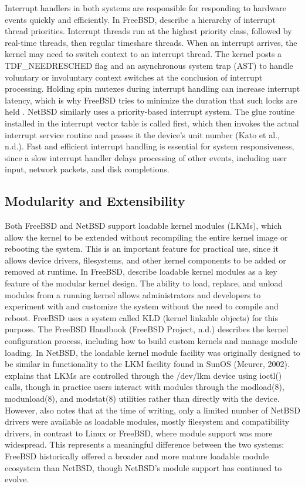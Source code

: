 Interrupt handlers in both systems are responsible for responding to hardware events quickly and efficiently. In FreeBSD, \textcite{watson2015} describe a hierarchy of interrupt thread priorities. Interrupt threads run at the highest priority class, followed by real-time threads, then regular timeshare threads. When an interrupt arrives, the kernel may need to switch context to an interrupt thread. The kernel posts a TDF\_NEEDRESCHED flag and an asynchronous system trap (AST) to handle voluntary or involuntary context switches at the conclusion of interrupt processing. Holding spin mutexes during interrupt handling can increase interrupt latency, which is why FreeBSD tries to minimize the duration that such locks are held \parencite{watson2015}.
NetBSD similarly uses a priority-based interrupt system. The glue routine installed in the interrupt vector table is called first, which then invokes the actual interrupt service routine and passes it the device's unit number (Kato et al., n.d.). Fast and efficient interrupt handling is essential for system responsiveness, since a slow interrupt handler delays processing of other events, including user input, network packets, and disk completions.


\subsection{Modularity and Extensibility}
Both FreeBSD and NetBSD support loadable kernel modules (LKMs), which allow the kernel to be extended without recompiling the entire kernel image or rebooting the system. This is an important feature for practical use, since it allows device drivers, filesystems, and other kernel components to be added or removed at runtime.
In FreeBSD, \textcite{watson2015} describe loadable kernel modules as a key feature of the modular kernel design. The ability to load, replace, and unload modules from a running kernel allows administrators and developers to experiment with and customize the system without the need to compile and reboot. FreeBSD uses a system called KLD (kernel linkable objects) for this purpose. The FreeBSD Handbook (FreeBSD Project, n.d.) describes the kernel configuration process, including how to build custom kernels and manage module loading.
In NetBSD, the loadable kernel module facility was originally designed to be similar in functionality to the LKM facility found in SunOS (Meurer, 2002). \textcite{meurer2002} explains that LKMs are controlled through the /dev/lkm device using ioctl() calls, though in practice users interact with modules through the modload(8), modunload(8), and modstat(8) utilities rather than directly with the device. However, \textcite{meurer2002} also notes that at the time of writing, only a limited number of NetBSD drivers were available as loadable modules, mostly filesystem and compatibility drivers, in contrast to Linux or FreeBSD, where module support was more widespread. This represents a meaningful difference between the two systems: FreeBSD historically offered a broader and more mature loadable module ecosystem than NetBSD, though NetBSD's module support has continued to evolve.

